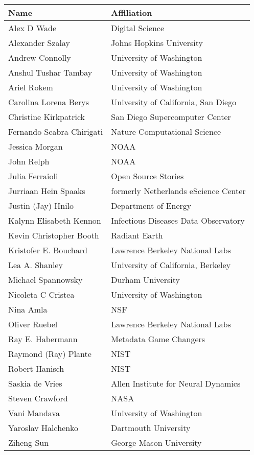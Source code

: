 \documentclass[
  number]{elsarticle}
\begin{document}
\begin{longtable}[]{@{}ll@{}}
\toprule\noalign{}
Name & Affiliation \\
\midrule\noalign{}
\endhead
\bottomrule\noalign{}
\endlastfoot
Alex D Wade & Digital Science \\
Alexander Szalay & Johns Hopkins University \\
Andrew Connolly & University of Washington \\
Anshul Tushar Tambay & University of Washington \\
Ariel Rokem & University of Washington \\
Carolina Lorena Berys & University of California, San Diego \\
Christine Kirkpatrick & San Diego Supercomputer Center \\
Fernando Seabra Chirigati & Nature Computational Science \\
Jessica Morgan & NOAA \\
John Relph & NOAA \\
Julia Ferraioli & Open Source Stories \\
Jurriaan Hein Spaaks & formerly Netherlands eScience Center \\
Justin (Jay) Hnilo & Department of Energy \\
Kalynn Elisabeth Kennon & Infectious Diseases Data Observatory \\
Kevin Christopher Booth & Radiant Earth \\
Kristofer E. Bouchard & Lawrence Berkeley National Labs \\
Lea A. Shanley & University of California, Berkeley \\
Michael Spannowsky & Durham University \\
Nicoleta C Cristea & University of Washington \\
Nina Amla & NSF \\
Oliver Ruebel & Lawrence Berkeley National Labs \\
Ray E. Habermann & Metadata Game Changers \\
Raymond (Ray) Plante & NIST \\
Robert Hanisch & NIST \\
Saskia de Vries & Allen Institute for Neural Dynamics \\
Steven Crawford & NASA \\
Vani Mandava & University of Washington \\
Yaroslav Halchenko & Dartmouth University \\
Ziheng Sun & George Mason University \\
\end{longtable}
\end{document}
